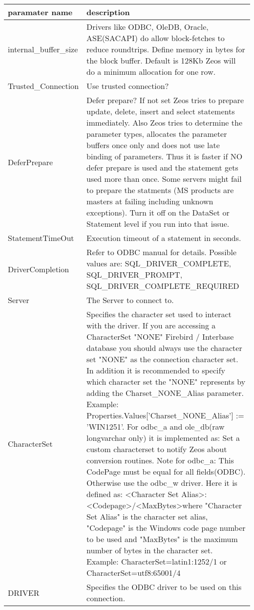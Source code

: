 \documentclass[a4paper,12pt,oneside]{report}
\begin{document}
\begin{tabularx}{\textwidth}{lX}
    paramater name & description \\ \hline
		internal\_buffer\_size & 
		  Drivers like ODBC, OleDB, Oracle, ASE(SACAPI) do allow block-fetches to reduce roundtrips.
      Define memory in bytes for the block buffer.
			Default is 128Kb
      Zeos will do a minimum allocation for one row. \\
		Trusted\_Connection &
		  Use trusted connection? \\
		DeferPrepare &
      Defer prepare? If not set Zeos tries to prepare update, delete, insert and select statements immediately.
      Also Zeos tries to determine the parameter types, allocates the parameter buffers once only and does not use late binding of parameters.
			Thus it is faster if NO defer prepare is used and the statement gets used more than once.
      Some servers might fail to prepare the statments (MS products are masters at failing including unknown exceptions).
			Turn it off on the DataSet or Statement level if you run into that issue. \\
		StatementTimeOut &
		  Execution timeout of a statement in seconds. \\
    DriverCompletion &
		   Refer to ODBC manual for details. Possible values are:
		  SQL\_DRIVER\_COMPLETE, SQL\_DRIVER\_PROMPT, SQL\_DRIVER\_COMPLETE\_REQUIRED \\
	Server &
		  The Server to connect to. \\
		CharacterSet &
		  Specifies the character set used to interact with the driver.
      If you are accessing a CharacterSet "NONE" Firebird / Interbase database you should always use the character set "NONE" as the connection character set.
			In addition it is recommended to specify which character set the "NONE" represents by adding the Charset\_NONE\_Alias parameter.
      Example: Properties.Values['Charset\_NONE\_Alias'] := 'WIN1251'.
      For odbc\_a and ole\_db(raw longvarchar only) it is implemented as:
      Set a custom characterset to notify Zeos about conversion routines.
      Note for odbc\_a: This CodePage must be equal for all fields(ODBC).
      Otherwise use the odbc\_w driver.
			Here it is defined as:
			\textless Character Set Alias\textgreater:\textless Codepage\textgreater/\textless MaxBytes\textgreater where "Character Set Alias" is the character set alias, "Codepage" is the Windows code page number to be used and "MaxBytes" is the maximum number of bytes in the character set.
			Example: CharacterSet=latin1:1252/1 or CharacterSet=utf8:65001/4 \\
		DRIVER &
		  Specifies the ODBC driver to be used on this connection. \\
\end{tabularx}
\end{document}

